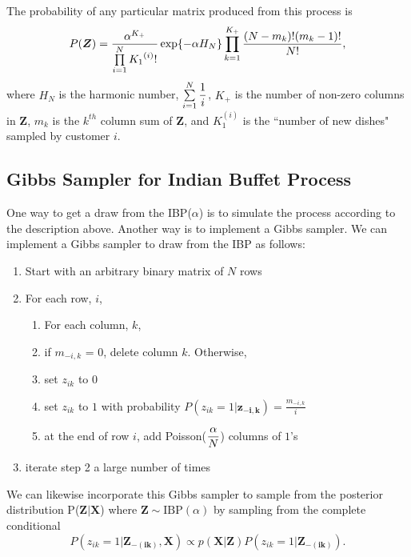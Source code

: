 \noindent
The probability of any particular matrix produced from this process is
\begin{equation}
  P(\bm{Z}) = \frac{\alpha^{K_+}}{\prod\limits_{i=1}^{N} {K_1}^{(i)}!} 
              \exp\{-\alpha H_N\}\prod\limits_{k=1}^{K_+}
              \frac{(N-m_k)!(m_k-1)!}{N!},
\end{equation}
where $H_N$ is the harmonic number, $\sum\limits_{i=1}^{N}\displaystyle\frac{1}{i}$, $K_+$ is
the number of non-zero columns in $\bm Z$, $m_k$ is the $k^{th}$ column sum of
$\bm Z$, and $K_1^{(i)}$ is the ``number of new dishes" sampled by customer $i$.\\

\subsection{Gibbs Sampler for Indian Buffet Process}
One way to get a draw from the IBP($\alpha$) is to simulate the process
according to the description above. Another way is to implement a Gibbs
sampler. We can implement a Gibbs sampler to draw from the IBP as follows:

\begin{enumerate}
  \item Start with an arbitrary binary matrix of $N$ rows
  \item For each row, $i$,
  \begin{enumerate}
    \item For each column, $k$,
    \item if $m_{-i,k}$ = $0$, delete column $k$. Otherwise,
    \item set $z_{ik}$ to $0$
    \item set $z_{ik}$ to $1$ with probability $P(z_{ik}=1|\bm{z_{-i,k}}) = \frac{m_{-i,k}}{i}$
    \item at the end of row $i$, add Poisson($\displaystyle\frac{\alpha}{N}$) columns of $1$'s
  \end{enumerate}
  \item iterate step 2 a large number of times
\end{enumerate}
We can likewise incorporate this Gibbs sampler to sample from the posterior
distribution P($\bm{Z|X}$) where $\bm Z \sim \text{IBP}(\alpha)$ by sampling
from the complete conditional
\begin{equation}
  P(z_{ik}=1|\bm{Z_{-(ik)},X})  \propto p(\bm{X|Z}) P(z_{ik}=1|\bm{Z_{-(ik)}}).
\end{equation}

